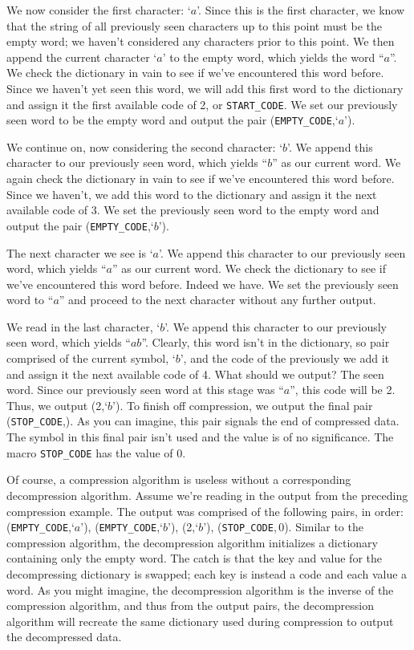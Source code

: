 \documentclass{article}
\begin{document}
We now consider the first character: `$a$'. Since this is the first character,
we know that the string of all previously seen characters up to this point must
be the empty word; we haven't considered any characters prior to this point.  We
then append the current character `$a$' to the empty word, which yields the word
``$a$''. We check the dictionary in vain to see if we've encountered this word
before. Since we haven't yet seen this word, we will add this first word to the
dictionary and assign it the first available code of 2, or \texttt{START\_CODE}.
We set our previously seen word to be the empty word and output the pair
(\texttt{EMPTY\_CODE},\;`$a$').

We continue on, now considering the second character: `$b$'. We append this
character to our previously seen word, which yields ``$b$'' as our current word.
We again check the dictionary in vain to see if we've encountered this word
before. Since we haven't, we add this word to the dictionary and assign it the
next available code of 3. We set the previously seen word to the empty word and
output the pair (\texttt{EMPTY\_CODE},\;`$b$').

The next character we see is `$a$'. We append this character to our previously
seen word, which yields ``$a$'' as our current word. We check the dictionary to
see if we've encountered this word before. Indeed we have. We set the previously
seen word to ``$a$'' and proceed to the next character without any further
output.

We read in the last character, `$b$'. We append this character to our previously
seen word, which yields ``$ab$''. Clearly, this word isn't in the dictionary, so
pair comprised of the current symbol, `$b$', and the code of the previously
we add it and assign it the next available code of 4. What should we output? The
seen word. Since our previously seen word at this stage was ``$a$'', this code
will be 2. Thus, we output (2,\;`$b$'). To finish off compression, we output the
final pair (\texttt{STOP\_CODE},). As you can imagine, this pair signals the
end of compressed data. The symbol in this final pair isn't used and the value
is of no significance. The macro \texttt{STOP\_CODE} has the value of 0.

Of course, a compression algorithm is useless without a corresponding
decompression algorithm. Assume we're reading in the output from the preceding
compression example. The output was comprised of the following pairs, in order:
(\texttt{EMPTY\_CODE},\;`$a$'), (\texttt{EMPTY\_CODE},\;`$b$'), (2,\;`$b$'),
(\texttt{STOP\_CODE},\,0). Similar to the compression algorithm, the
decompression algorithm initializes a dictionary containing only the empty word.
The catch is that the key and value for the decompressing dictionary is swapped;
each key is instead a code and each value a word. As you might imagine, the
decompression algorithm is the inverse of the compression algorithm, and thus
from the output pairs, the decompression algorithm will recreate the same
dictionary used during compression to output the decompressed data.
\end{document}
